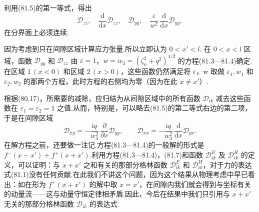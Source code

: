 利用(81.5)的第一等式，得出
\begin{equation}
  \mathcal{D}_{zz},\quad \frac{\mathrm{d}}{\mathrm{d}x}\mathcal{D}_{zz},\quad \mathcal{D}_{yy},\quad \frac{\varepsilon}{w^{2}}\,\frac{\mathrm{d}}{\mathrm{d}x}\mathcal{D}_{yy},
\end{equation}
在分界面上必须连续.

因为考虑到只在间隙区域计算应力张量.所以立即认为 $0<x'<l$. 在 $0<x<l$ 区域，函数 $\mathcal{D}_{yy}$ 和 $\mathcal{D}_{zz}$ 由 $\varepsilon=1$，$w=w_3=(\zeta_n^{2}+q^{2})^{1/2}$ 的方程(81.3—81.4)确定.在区域 $1\,(x<0)$ 和区域 $2\,(x>0)$，这些函数仍然满足将 $\varepsilon$，w 取做 $\varepsilon_1,w_1$ 和 $\varepsilon_2,w_2$ 的那两个方程，此时方程的右侧均为零（因为在此 $x\neq x'$）.

根据(80.17)，所需要的减除，应归结为从间隙区域中的所有函数 $\mathcal{D}_{ik}$ 减去这些函数在 $\varepsilon_1=\varepsilon_2=1$ 之值.从而，特别是，可以略去(81.5)的第二等式右边的第二项，于是在间隙区域
\begin{equation}
  \mathcal{D}_{xy}=-\frac{\mathrm{i}q}{w_3^{2}}\,\frac{\partial}{\partial x}\mathcal{D}_{yy},\qquad \mathcal{D}_{xx}=-\frac{\mathrm{i}q}{w_3^{2}}\,\frac{\mathrm{d}}{\mathrm{d}x}\mathcal{D}_{yx}.
\end{equation}
在解方程之前，还要做一注记.方程(81.3—81.4)的一般解的形式是 $f^{-}(x-x')+f^{+}(x+x')$.利用方程(81.3—81.4)，(81.7)和函数 $\mathcal{D}^{E}_{ik}$ 及 $\mathcal{D}^{H}_{ik}$ 的定义，可以证明：与 $x+x'$ 之和有关的那部分格林函数 $\mathcal{D}^{E}_{ik}$ 和 $\mathcal{D}^{H}_{ik}$，对于力的表达式(81.1)没有任何贡献.在此我们不讲这个问题，因为这个结果从物理考虑中早已看出：如在形为 $f^{+}(x+x')$ 的解中取 $x=x'$，在间隙内我们就会得到与坐标有关的动量流——这与动量守恒定律相矛盾.因此，今后在结果中我们只引用与 $x+x'$ 无关的那部分格林函数 $\mathcal{D}_{ik}$ 的表达式.

